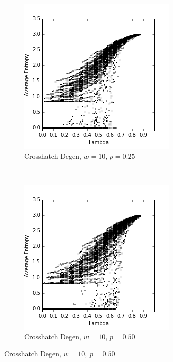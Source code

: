 \documentclass[a4paper,11pt]{report}
\begin{document}
\begin{figure}[htp]
\centering
\begin{subfigure}[t]{0.4\textwidth}
  \includegraphics[width=\textwidth]{ch6_figs/ch_w10_p25_entropy_scatter}
  \caption{Crosshatch Degen, $w=10$, $p=0.25$}

\end{subfigure}
~
\begin{subfigure}[t]{0.4\textwidth}
  \centering
  \includegraphics[width=\textwidth]{ch6_figs/ch_w10_p50_entropy_scatter}
  \caption{Crosshatch Degen, $w=10$, $p=0.50$}


\end{subfigure}
\end{figure}
\end{document}
